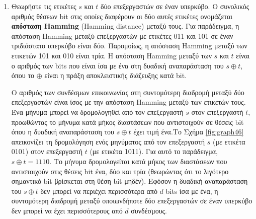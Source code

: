 \documentclass[12pt,a4paper]{article} %
\begin{document}
\begin{enumerate}
    \item Θεωρήστε τις ετικέτες $s$ και $t$ δύο επεξεργαστών σε έναν υπερκύβο. 
    Ο συνολικός αριθμός θέσεων bit στις οποίες 
    διαφέρουν οι δύο αυτές ετικέτες ονομάζεται \textbf{απόσταση Hamming} 
    (Hamming distance) μεταξύ τους. Για παράδειγμα, 
    η απόσταση Hamming μεταξύ επεξεργαστών με 
    ετικέτες 011 και 101 σε έναν τριδιάστατο υπερκύβο είναι δύο. 
    Παρομοίως, η απόσταση Hamming μεταξύ 
    των ετικετών 101 και 010 είναι τρία. Η απόσταση 
    Hamming μεταξύ των $s$ και $t$ είναι 
    ο αριθμός των bits που είναι ίσα με ένα 
    στη δυαδική αναπαράσταση του $s \oplus t$, όπου το $\oplus$ είναι 
    η πράξη αποκλειστικής διάζευξης κατά bit.

    Ο αριθμός των συνδέσμων επικοινωνίας στη συντομότερη διαδρομή 
    μεταξύ δύο επεξεργαστών είναι ίσος με την απόσταση 
    Hamming μεταξύ των ετικετών τους. 
    Ένα μήνυμα μπορεί να δρομολογηθεί από τον επεξεργαστή $s$ στον 
    επεξεργαστή $t$, προωθώντας το μήνυμα κατά μήκος διαστάσεων που 
    αντιστοιχούν σε θέσεις bit όπου η 
    δυαδική αναπαράσταση του $s \oplus t$ έχει τιμή ένα.Το Σχήμα \ref{fig:graph46} 
    απεικονίζει τη δρομολόγηση ενός μηνύματος από τον επεξεργαστή $s$ 
    (με ετικέτα 0101) στον επεξεργαστή $t$ (με ετικέτα 1011). Για αυτό 
    το παράδειγμα, $s \oplus t = 1110$. Το μήνυμα δρομολογείται κατά 
    μήκος των διαστάσεων που αντιστοιχούν στις θέσεις bit 
    ένα, δύο και τρία (θεωρώντας ότι το λιγότερο σημαντικό 
    bit βρίσκεται στη θέση bit 
    μηδέν). Εφόσον η δυαδική αναπαράσταση του $s \oplus t$ δεν μπορεί να 
    περιέχει περισσότερα από $d$ bits ίσα με 
    ένα, η συντομότερη διαδρομή μεταξύ οποιωνδήποτε δύο επεξεργαστών σε 
    έναν υπερκύβο δεν μπορεί να έχει περισσότερους από $d$ συνδέσμους.
\end{enumerate}
\end{document}
